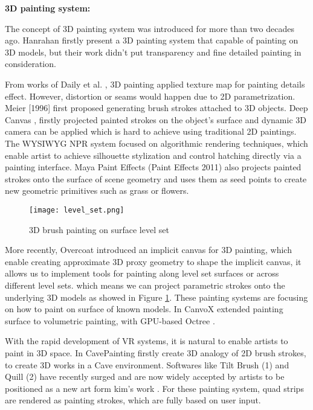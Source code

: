 \textbf{3D painting system:}\newline

The concept of 3D painting system was introduced for more than two decades ago.  Hanrahan \cite{hanrahan1990direct} firstly present a 3D painting system that capable of painting on 3D models, but their work didn’t put transparency and fine detailed painting in consideration. 

From works of  Daily et al. \cite{daily19953d}, 3D painting applied texture map for painting details effect. However, distortion or seams would happen due to 2D parametrization. Meier [1996] first proposed generating brush strokes attached to 3D objects.  Deep Canvas \cite{katanics2003deep}, firstly projected painted strokes on the object’s surface and dynamic 3D camera can be applied which is hard to achieve using traditional 2D paintings. The WYSIWYG NPR system \cite{kalnins2002wysiwyg} focused on algorithmic rendering techniques, which enable artist to achieve silhouette stylization and control hatching directly via a painting interface. Maya Paint Effects (Paint Effects 2011) also projects painted strokes onto the surface of scene geometry and uses them as seed points to create new geometric primitives such as grass or flowers.

\begin{figure}[H]
	\centering
	\texttt{[image: level\_set.png]}
	\caption{3D brush painting on surface level set}
	\label{level set}
\end{figure}

More recently, Overcoat \cite{schmid2011overcoat} introduced an implicit canvas for 3D painting, which enable creating approximate 3D proxy geometry to shape the implicit canvas, it allows us to implement tools for painting along level set surfaces or across different level sets. which means we can project parametric strokes onto the underlying 3D models as showed in Figure \ref{level set}.
These painting systems are focusing on how to paint on surface of known models. In CanvoX \cite{kim2017canvox} extended painting surface to volumetric painting, with GPU-based Octree \cite{lefebvre2005octree}.

With the rapid development of VR systems, it is natural to enable artists to paint in 3D space. In CavePainting \cite{keefe2001cavepainting} firstly create 3D analogy of 2D brush strokes, to create 3D works in a Cave environment. Softwares like Tilt Brush (1) and Quill (2) have recently surged and are now widely accepted by artists to be positioned as a new art form kim's work \cite{kim2017canvox}. For these painting system, quad strips are rendered as painting strokes, which are fully based on user input. 

